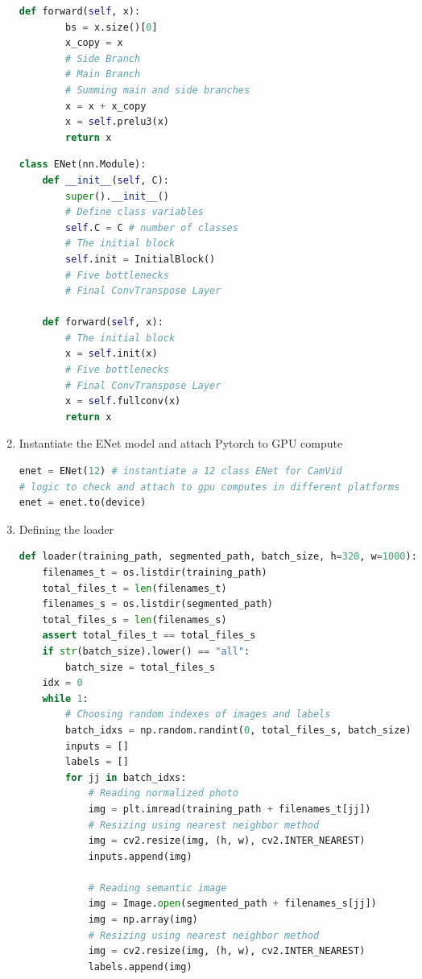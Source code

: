 \begin{enumerate}
\begin{lstlisting}[language=Python]
    def forward(self, x):
        bs = x.size()[0]
        x_copy = x
        # Side Branch
        # Main Branch
        # Summing main and side branches
        x = x + x_copy
        x = self.prelu3(x)
        return x
        \end{lstlisting}

	      \begin{lstlisting}[language=Python]
class ENet(nn.Module):
    def __init__(self, C):
        super().__init__()
        # Define class variables
        self.C = C # number of classes
        # The initial block
        self.init = InitialBlock()
        # Five bottlenecks
        # Final ConvTranspose Layer

    def forward(self, x):
        # The initial block
        x = self.init(x)
        # Five bottlenecks
        # Final ConvTranspose Layer
        x = self.fullconv(x)
        return x
        \end{lstlisting}
	\item Instantiate the ENet model and attach Pytorch to GPU compute \textit{}
	      \begin{lstlisting}[language=Python]
enet = ENet(12) # instantiate a 12 class ENet for CamVid
# logic to check and attach to gpu computes in different platforms
enet = enet.to(device)
        \end{lstlisting}
	\item Defining the loader
	      \begin{lstlisting}[language=Python]
def loader(training_path, segmented_path, batch_size, h=320, w=1000):
    filenames_t = os.listdir(training_path)
    total_files_t = len(filenames_t)
    filenames_s = os.listdir(segmented_path)
    total_files_s = len(filenames_s)
    assert total_files_t == total_files_s
    if str(batch_size).lower() == "all":
        batch_size = total_files_s
    idx = 0
    while 1:
        # Choosing random indexes of images and labels
        batch_idxs = np.random.randint(0, total_files_s, batch_size)
        inputs = []
        labels = []
        for jj in batch_idxs:
            # Reading normalized photo
            img = plt.imread(training_path + filenames_t[jj])
            # Resizing using nearest neighbor method
            img = cv2.resize(img, (h, w), cv2.INTER_NEAREST)
            inputs.append(img)

            # Reading semantic image
            img = Image.open(segmented_path + filenames_s[jj])
            img = np.array(img)
            # Resizing using nearest neighbor method
            img = cv2.resize(img, (h, w), cv2.INTER_NEAREST)
            labels.append(img)


\end{lstlisting}
\end{enumerate}
